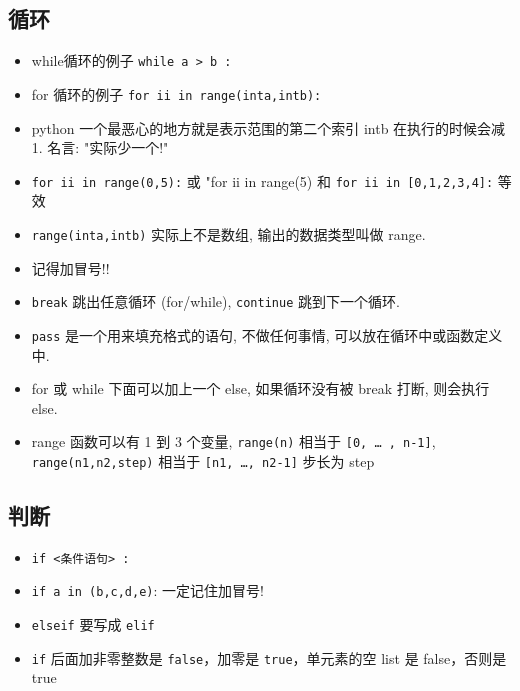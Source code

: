 \subsection{循环}
\begin{itemize}
\item while循环的例子  \verb`while a > b :`
\item for 循环的例子 \verb`for ii in range(inta,intb):`
\item python 一个最恶心的地方就是表示范围的第二个索引 intb 在执行的时候会减 1.  名言: "实际少一个!"
\item \verb`for ii in range(0,5):` 或 "for ii in range(5) 和 \verb`for ii in [0,1,2,3,4]:` 等效
\item \verb`range(inta,intb)` 实际上不是数组, 输出的数据类型叫做 range.
\item 记得加冒号!!
\item \verb`break` 跳出任意循环 (for/while), \verb`continue` 跳到下一个循环.
\item \verb`pass` 是一个用来填充格式的语句, 不做任何事情, 可以放在循环中或函数定义中.
\item for 或 while 下面可以加上一个 else, 如果循环没有被 break 打断, 则会执行 else.
\item range 函数可以有 1 到 3 个变量, \verb`range(n)` 相当于 \verb`[0, … , n-1]`, \verb`range(n1,n2,step)` 相当于 \verb`[n1, …, n2-1]` 步长为 step 
\end{itemize}

\subsection{判断}
\begin{itemize}
\item \verb`if <条件语句> :`
\item \verb`if a in (b,c,d,e)`:   一定记住加冒号!
\item \verb`elseif` 要写成 \verb`elif`
\item \verb`if` 后面加非零整数是 \verb`false`，加零是 \verb`true`，单元素的空 list 是 false，否则是 true
\end{itemize}

